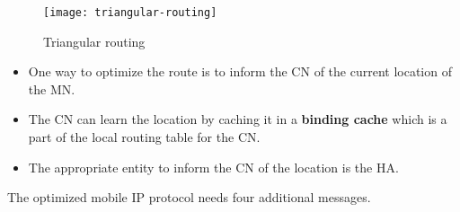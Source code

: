 
\begin{figure}[ht!]
	\centering
	\texttt{[image: triangular-routing]}
	\caption{Triangular routing}\label{fig:triangular-routing}
\end{figure}

\begin{itemize}
	\item One way to optimize the route is to inform the CN of the current location of the MN. 
	\item The CN can learn the location by caching it in a \textbf{binding cache} which is a part of the local routing table for the CN. 
	\item The appropriate entity to inform the CN of the location is the HA. 
\end{itemize}

The optimized mobile IP protocol needs four additional messages.

